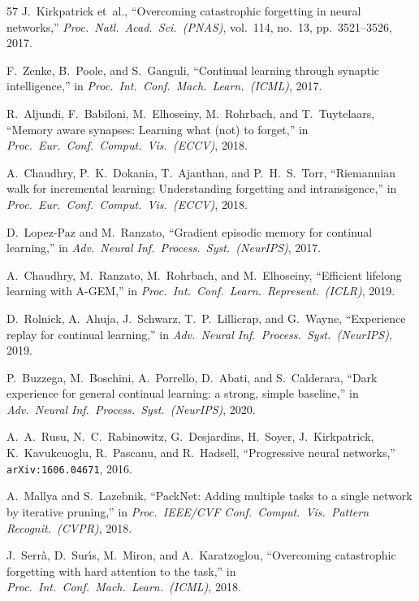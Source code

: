 \documentclass[10pt]{article}
\begin{document}
\begin{thebibliography}{57}
J.~Kirkpatrick et~al., ``Overcoming catastrophic forgetting in neural networks,'' \emph{Proc.\ Natl.\ Acad.\ Sci.\ (PNAS)}, vol.~114, no.~13, pp.~3521--3526, 2017.

F.~Zenke, B.~Poole, and S.~Ganguli, ``Continual learning through synaptic intelligence,'' in \emph{Proc.\ Int.\ Conf.\ Mach.\ Learn.\ (ICML)}, 2017.

R.~Aljundi, F.~Babiloni, M.~Elhoseiny, M.~Rohrbach, and T.~Tuytelaars, ``Memory aware synapses: Learning what (not) to forget,'' in \emph{Proc.\ Eur.\ Conf.\ Comput.\ Vis.\ (ECCV)}, 2018.

A.~Chaudhry, P.~K.~Dokania, T.~Ajanthan, and P.~H.~S.~Torr, ``Riemannian walk for incremental learning: Understanding forgetting and intransigence,'' in \emph{Proc.\ Eur.\ Conf.\ Comput.\ Vis.\ (ECCV)}, 2018.

D.~Lopez-Paz and M.~Ranzato, ``Gradient episodic memory for continual learning,'' in \emph{Adv.\ Neural Inf.\ Process.\ Syst.\ (NeurIPS)}, 2017.

A.~Chaudhry, M.~Ranzato, M.~Rohrbach, and M.~Elhoseiny, ``Efficient lifelong learning with A-GEM,'' in \emph{Proc.\ Int.\ Conf.\ Learn.\ Represent.\ (ICLR)}, 2019.

D.~Rolnick, A.~Ahuja, J.~Schwarz, T.~P.~Lillicrap, and G.~Wayne, ``Experience replay for continual learning,'' in \emph{Adv.\ Neural Inf.\ Process.\ Syst.\ (NeurIPS)}, 2019.

P.~Buzzega, M.~Boschini, A.~Porrello, D.~Abati, and S.~Calderara, ``Dark experience for general continual learning: a strong, simple baseline,'' in \emph{Adv.\ Neural Inf.\ Process.\ Syst.\ (NeurIPS)}, 2020.

A.~A.~Rusu, N.~C.~Rabinowitz, G.~Desjardins, H.~Soyer, J.~Kirkpatrick, K.~Kavukcuoglu, R.~Pascanu, and R.~Hadsell, ``Progressive neural networks,'' \texttt{arXiv:1606.04671}, 2016.

A.~Mallya and S.~Lazebnik, ``PackNet: Adding multiple tasks to a single network by iterative pruning,'' in \emph{Proc.\ IEEE/CVF Conf.\ Comput.\ Vis.\ Pattern Recognit.\ (CVPR)}, 2018.

J.~Serr{\`a}, D.~Sur{\'\i}s, M.~Miron, and A.~Karatzoglou, ``Overcoming catastrophic forgetting with hard attention to the task,'' in \emph{Proc.\ Int.\ Conf.\ Mach.\ Learn.\ (ICML)}, 2018.


\end{thebibliography}
\end{document}
